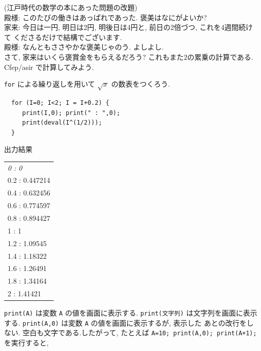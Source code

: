\documentclass{jbook}
\begin{document}
\noindent
{}
(江戸時代の数学の本にあった問題の改題) \\
殿様: このたびの働きはあっぱれであった. 褒美はなにがよいか? \\
家来: 今日は一円, 明日は2円, 明後日は4円と, 前日の2倍づつ, これを4週間続けて
くださるだけで結構でございます. \\
殿様: なんともささやかな褒美じゃのう. よしよし. \\
さて, 家来はいくら褒賞金をもらえるだろう?
これもまた$2$の累乗の計算である. 
Cfep/asir で計算してみよう.



\begin{example}\Begin \quad
{\tt for} による繰り返しを用いて $\sqrt{x}$ の数表をつくろう.
\begin{screen}
\begin{center}
\begin{verbatim}
  for (I=0; I<2; I = I+0.2) {
     print(I,0); print(" : ",0);
     print(deval(I^(1/2)));
  }
\end{verbatim}
\end{center}
\end{screen}
出力結果
\begin{center}
\begin{tabular}{|l|} \hline \sl
0 : 0 \\
0.2 : 0.447214 \\
0.4 : 0.632456 \\
0.6 : 0.774597 \\
0.8 : 0.894427 \\
1 : 1 \\
1.2 : 1.09545 \\
1.4 : 1.18322 \\
1.6 : 1.26491 \\
1.8 : 1.34164 \\
2 : 1.41421 \\
\hline 
\end{tabular}
\end{center}
\rm
{}
{\tt print(A)} は変数 {\tt A} の値を画面に表示する.
{\tt print(文字列)} は文字列を画面に表示する.
{\tt print(A,0)} は変数 {\tt A} の値を画面に表示するが, 表示した
あとの改行をしない.
空白も文字である.したがって, たとえば
{\tt A=10; print(A,0); print(A+1);} 
を実行すると,   

\end{example}
\end{document}
